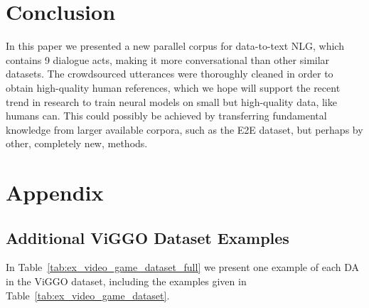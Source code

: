 \documentclass[11pt,a4paper]{article}
\begin{document}
\section{Conclusion}
\label{sec:conclusion}

In this paper we presented a new parallel corpus for data-to-text NLG, which contains 9 dialogue acts, making it more conversational than other similar datasets. The crowdsourced utterances were thoroughly cleaned in order to obtain high-quality human references, which we hope will support the recent trend in research to train neural models on small but high-quality data, like humans can. This could possibly be achieved by transferring fundamental knowledge from larger available corpora, such as the E2E dataset, but perhaps by other, completely new, methods.










\appendix

\section{Appendix}
\label{sec:appendix}


\subsection{Additional ViGGO Dataset Examples}

In Table~\ref{tab:ex_video_game_dataset_full} we present one example of each DA in the ViGGO dataset, including the examples given in Table~\ref{tab:ex_video_game_dataset}.
\end{document}
